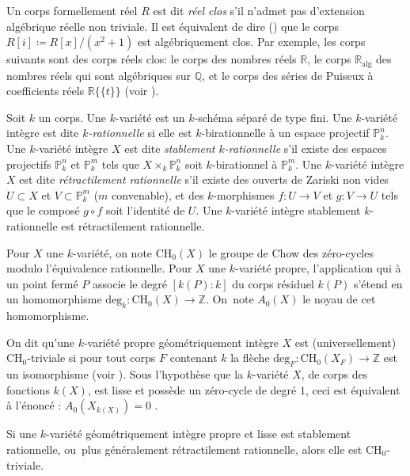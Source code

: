 \documentclass[JEP,XML,SOM,Unicode,francais,published]{cedram}
\newcommand{\alg}{\mathrm{alg}}
\newcommand{\CH}{\mathrm{CH}}
\theoremstyle{definition}
\newcommand{\Z}{\mathbb Z}
\renewcommand{\P}{\mathbb P}
\newcommand{\puiseux}{\mathbb{R}\{\!\{t\}\!\}}
\begin{document}
Un corps formellement réel $R$ est dit {\it réel clos} s'il n'admet pas d'extension algébrique réelle non triviale. Il est équivalent de dire (\cf \cite[Th.\,1.2.2]{bochnak1998real}) que le corps $R[i]\coloneqq R[x]/(x^2+1)$ est algébriquement clos.
Par exemple, les corps suivants sont des corps réels clos: le corps des nombres réels $\mathbb R$, le corps $\mathbb R_{\alg}$ des nombres réels qui sont algébriques sur $\mathbb Q$, et le corps des séries de Puiseux à coefficients réels $\puiseux$ (voir \cite[Ex.\,1.2.3]{bochnak1998real}).

\medskip

Soit $k$ un corps.
Une $k$-variété est un $k$-schéma séparé de type fini. Une $k$-variété intègre
est dite {\it $k$-rationnelle} si elle est $k$-birationnelle à un espace projectif $\P^n_{k}$.
Une $k$-variété intègre $X$ est dite {\it stablement $k$-rationnelle} s'il existe des espaces projectifs
$\P^n_{k}$ et $\P^m_{k}$ tels que $X \times_{k}\P^n_{k}$ soit $k$-birationnel à $\P^m_{k}$.
Une $k$-variété intègre $X$ est dite {\it rétractilement rationnelle}
s'il existe des ouverts de Zariski non vides $U \subset X$ et $V \subset \P^m_{k}$ ($m$ convenable),
et des $k$-morphismes $ f \colon U \to V$ et $g \colon V \to U$ tels que le composé $g \circ f$ soit l'identité de $U$.
Une $k$-variété intègre stablement $k$-rationnelle est rétractilement rationnelle.

\medskip

Pour $X$ une $k$-variété, on note $\CH_{0}(X)$ le groupe de Chow des zéro-cycles modulo l'équivalence rationnelle.
Pour $X$ une $k$-variété propre, l'application qui à un point fermé $P$
associe le degré $[k(P):k]$ du corps résiduel $k(P)$ s'étend en un homomorphisme
$ \mathrm{deg}_{k} \colon \CH_{0}(X) \to \Z$. On~note $A_{0}(X)$ le noyau de cet homomorphisme.

On dit qu'une $k$-variété propre géométriquement intègre $X$ est (universellement) $\CH_{0}$-triviale si pour tout corps $F$ contenant $k$
la flèche $ \mathrm{deg}_{F} \colon \CH_{0}(X_{F}) \to \Z$ est un isomorphisme
(voir \cite{auel2017universal, colliot2016hypersurfaces}).
Sous l'hypothèse que la $k$-variété $X$, de corps des fonctions $k(X)$, est lisse et
possède un zéro-cycle de degré $1$, ceci est équivalent à l'énoncé : $A_{0}(X_{k(X)})=0$ \cite[Lem.\,1.3]{auel2017universal}.

Si une $k$-variété géométriquement intègre propre et lisse est stablement rationnelle, ou~plus généralement rétractilement rationnelle, alors elle est $\CH_{0}$-triviale.
\end{document}
